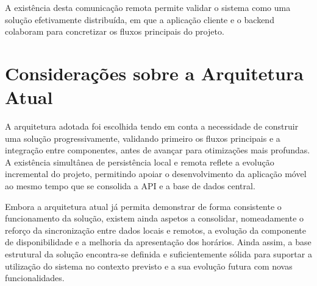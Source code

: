 A existência desta comunicação remota permite validar o sistema como uma solução efetivamente distribuída, em que a aplicação cliente
e o backend colaboram para concretizar os fluxos principais do projeto.

\section{Considerações sobre a Arquitetura Atual}

A arquitetura adotada foi escolhida tendo em conta a necessidade de construir uma solução progressivamente, validando primeiro os fluxos
principais e a integração entre componentes, antes de avançar para otimizações mais profundas. A existência simultânea de persistência local
e remota reflete a evolução incremental do projeto, permitindo apoiar o desenvolvimento da aplicação móvel ao mesmo tempo que se consolida a
API e a base de dados central.

Embora a arquitetura atual já permita demonstrar de forma consistente o funcionamento da solução, existem ainda aspetos a consolidar,
nomeadamente o reforço da sincronização entre dados locais e remotos, a evolução da componente de disponibilidade e a melhoria da apresentação dos horários.
Ainda assim, a base estrutural da solução encontra-se definida e suficientemente sólida para suportar a utilização do sistema no contexto previsto e a sua evolução futura com novas funcionalidades.